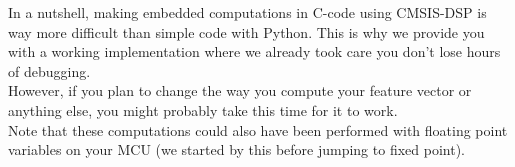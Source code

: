 %
In a nutshell, making embedded computations in C-code using CMSIS-DSP is way more difficult than simple code with Python. This is why we provide you with a working implementation where we already took care you don't lose hours of debugging. \\
However, if you plan to change the way you compute your feature vector or anything else, you might probably take this time for it to work. \\
Note that these computations could also have been performed with floating point variables on your MCU (we started by this before jumping to fixed point).
